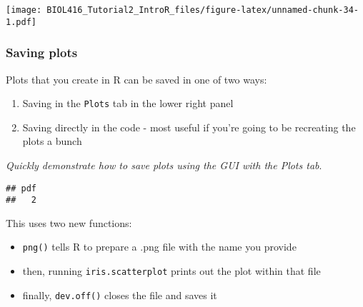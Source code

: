 \documentclass[]{article}
\newenvironment{Shaded}{\begin{snugshade}}{\end{snugshade}}
\newcommand{\KeywordTok}[1]{\textcolor[rgb]{0.13,0.29,0.53}{\textbf{#1}}}
\newcommand{\DataTypeTok}[1]{\textcolor[rgb]{0.13,0.29,0.53}{#1}}
\newcommand{\DecValTok}[1]{\textcolor[rgb]{0.00,0.00,0.81}{#1}}
\newcommand{\StringTok}[1]{\textcolor[rgb]{0.31,0.60,0.02}{#1}}
\newcommand{\CommentTok}[1]{\textcolor[rgb]{0.56,0.35,0.01}{\textit{#1}}}
\newcommand{\OperatorTok}[1]{\textcolor[rgb]{0.81,0.36,0.00}{\textbf{#1}}}
\newcommand{\NormalTok}[1]{#1}
\providecommand{\tightlist}{%
  \setlength{\itemsep}{0pt}\setlength{\parskip}{0pt}}
\begin{document}
\texttt{[image: BIOL416\_Tutorial2\_IntroR\_files/figure-latex/unnamed-chunk-34-1.pdf]}

\subsubsection{Saving plots}\label{saving-plots}

Plots that you create in R can be saved in one of two ways:

\begin{enumerate}
\def\labelenumi{\arabic{enumi}.}
\tightlist
\item
  Saving in the \texttt{Plots} tab in the lower right panel
\item
  Saving directly in the code - most useful if you're going to be
  recreating the plots a bunch
\end{enumerate}

\emph{Quickly demonstrate how to save plots using the GUI with the Plots
tab}.

\begin{Shaded}
\end{Shaded}

\begin{verbatim}
## pdf 
##   2
\end{verbatim}

This uses two new functions:

\begin{itemize}
\tightlist
\item
  \texttt{png()} tells R to prepare a .png file with the name you
  provide
\item
  then, running \texttt{iris.scatterplot} prints out the plot within
  that file
\item
  finally, \texttt{dev.off()} closes the file and saves it
\end{itemize}
\end{document}
